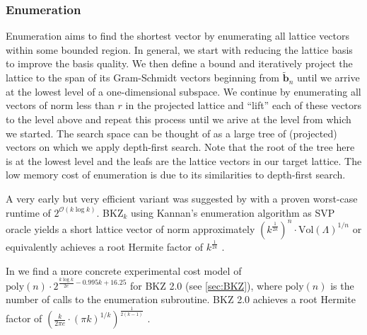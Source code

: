 \subsubsection{Enumeration} \label{sec:enumeration}%
Enumeration aims to find the shortest vector by enumerating all lattice vectors within some bounded region. In general, we start with reducing the lattice basis to improve the basis quality. We then define a bound and iteratively project the lattice to the span of its Gram-Schmidt vectors beginning from $\tilde{\mathbf{b}}_n$ until we arrive at the lowest level of a one-dimensional subspace. We continue by enumerating all vectors of norm less than $r$ in the projected lattice and ``lift'' each of these vectors to the level above and repeat this process until we arive at the level from which we started. The search space can be thought of as a large tree of (projected) vectors on which we apply depth-first search. Note that the root of the tree here is at the lowest level and the leafs are the lattice vectors in our target lattice. %
The low memory cost of enumeration is due to its similarities to depth-first search.

A very early but very efficient variant was suggested by \citet{Kan83} with a proven worst-case runtime of $2^{\mathcal{O}(k \log k)}$. BKZ$_k$ using Kannan's enumeration algorithm as SVP oracle yields a short lattice vector of norm approximately $\left(k^{\frac{1}{2k}}\right)^n\cdot \text{Vol}(\Lambda)^{1/n}$ or equivalently achieves a root Hermite factor of $k^{\frac{1}{2k}}$ \cite{HS07, ABFKSW20}. %

In \cite{ABFKSW20} we find a more concrete experimental cost model of $\text{poly}(n) \cdot 2^{\frac{k \log k}{2e}  - 0.995 k + 16.25}$ for BKZ 2.0 (see \cref{sec:BKZ}), where $\text{poly}(n)$ is the number of calls to the enumeration subroutine. BKZ 2.0 achieves a  root Hermite factor of $\left(\frac{k}{2\pi e} \cdot (\pi k)^{1/k}\right)^{\frac{1}{2(k-1)}}$ \cite{Chen13}.

